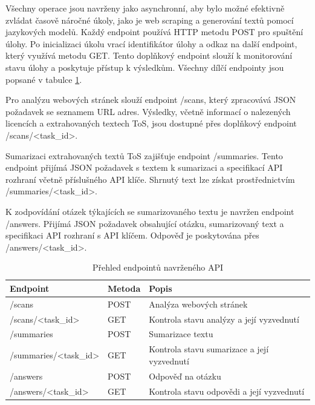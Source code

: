 Všechny operace jsou navrženy jako asynchronní, aby bylo možné efektivně zvládat časově náročné úkoly, jako je web scraping a generování textů pomocí jazykových modelů.
Každý endpoint používá HTTP metodu POST pro spuštění úlohy.
Po inicializaci úkolu vrací identifikátor úlohy a odkaz na další endpoint, který využívá metodu GET.
Tento doplňkový endpoint slouží k monitorování stavu úlohy a poskytuje přístup k výsledkům.
Všechny dílčí endpointy jsou popsané v tabulce \ref{tab:api_endpoints}.

Pro analýzu webových stránek slouží endpoint /scans, který zpracovává JSON požadavek se seznamem URL adres.
Výsledky, včetně informací o nalezených licencích a extrahovaných textech ToS, jsou dostupné přes doplňkový endpoint /scans/<task_id>.

Sumarizaci extrahovaných textů ToS zajišťuje endpoint /summaries.
Tento endpoint přijímá JSON požadavek s textem k sumarizaci a specifikací API rozhraní včetně příslušného API klíče.
Shrnutý text lze získat prostřednictvím /summaries/<task_id>.

K zodpovídání otázek týkajících se sumarizovaného textu je navržen endpoint /answers.
Přijímá JSON požadavek obsahující otázku, sumarizovaný text a specifikaci API rozhraní s API klíčem.
Odpověď je poskytována přes /answers/<task_id>.

\begin{table}[H]
	\centering
	\begin{tabular}{|p{}|p{}|p{}|}
		\hline
		\textbf{Endpoint} & \textbf{Metoda} & \textbf{Popis} \\ \hline
		/scans & POST & Analýza webových stránek \\ \hline
        \parbox{0.4\textwidth}{/scans/<task\_id>} & GET & Kontrola stavu analýzy a její vyzvednutí \\ \hline
		\parbox{0.4\textwidth}{/summaries} & POST & Sumarizace textu \\ \hline
		\parbox{0.4\textwidth}{/summaries/<task\_id>} & GET & Kontrola stavu sumarizace a její vyzvednutí \\ \hline
		/answers & POST & Odpověď na otázku \\ \hline
		\parbox{0.4\textwidth}{/answers/<task\_id>} & GET & Kontrola stavu odpovědi a její vyzvednutí \\ \hline
	\end{tabular}
	\caption{Přehled endpointů navrženého API}
	\label{tab:api_endpoints}
\end{table}

